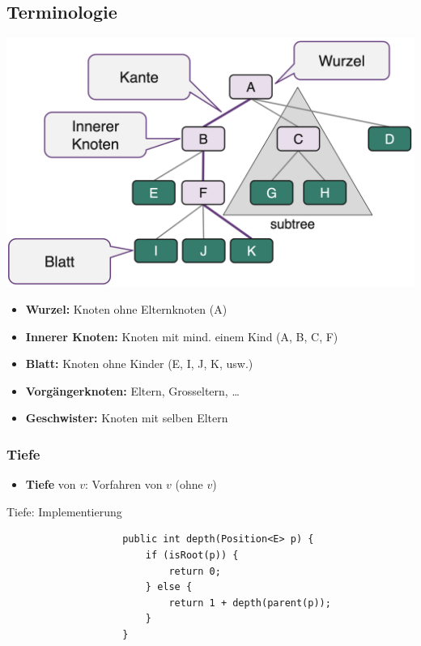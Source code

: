 \documentclass[a4paper, landscape, 8pt]{scrartcl}
\begin{document}
\begin{multicols*}{4}
            \subsection{Terminologie}
                \includegraphics[scale=0.14]{graphic/09_terminologie_baum}
                \begin{itemize}
                    \item {\bfseries Wurzel:} Knoten ohne Elternknoten (A)
                    \item {\bfseries Innerer Knoten:} Knoten mit mind. einem Kind (A, B, C, F)
                    \item {\bfseries Blatt:} Knoten ohne Kinder (E, I, J, K, usw.)
                    \item {\bfseries Vorgängerknoten:} Eltern, Grosseltern, \ldots
                    \item {\bfseries Geschwister:} Knoten mit selben Eltern
                \end{itemize}

                \subsubsection{Tiefe}
                    \begin{itemize}
                        \item {\bfseries Tiefe} von $v$: \textcolor{subsectioncolor}{Vorfahren von $v$} (ohne $v$)
                    \end{itemize}
                    \textcolor{subsectioncolor}{Tiefe: Implementierung}
                    \begin{lstlisting}
                    public int depth(Position<E> p) {
                        if (isRoot(p)) {
                            return 0;
                        } else {
                            return 1 + depth(parent(p));
                        }
                    }
                    \end{lstlisting}


\end{multicols*}
\end{document}
